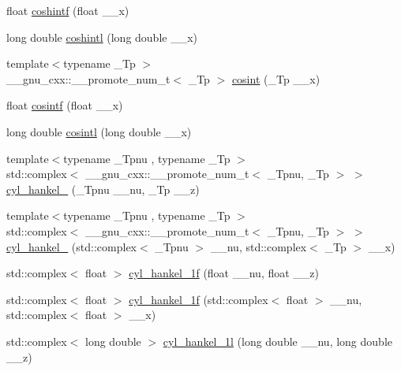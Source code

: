 \begin{DoxyCompactItemize}
\item 
float \hyperlink{namespace____gnu__cxx_a1af4d48209169967a836bd97e625a128}{coshintf} (float \+\_\+\+\_\+x)
\item 
long double \hyperlink{namespace____gnu__cxx_a6d24ab53fad13d421f07d9a9a509de14}{coshintl} (long double \+\_\+\+\_\+x)
\item 
{\footnotesize template$<$typename \+\_\+\+Tp $>$ }\\\+\_\+\+\_\+gnu\+\_\+cxx\+::\+\_\+\+\_\+promote\+\_\+num\+\_\+t$<$ \+\_\+\+Tp $>$ \hyperlink{namespace____gnu__cxx_afa310665ffc65012269f6f90cb573502}{cosint} (\+\_\+\+Tp \+\_\+\+\_\+x)
\item 
float \hyperlink{namespace____gnu__cxx_a87202351dc97d2c69e42bf58f911fb5a}{cosintf} (float \+\_\+\+\_\+x)
\item 
long double \hyperlink{namespace____gnu__cxx_a5f01f17ae8859129860118b09d51791c}{cosintl} (long double \+\_\+\+\_\+x)
\item 
{\footnotesize template$<$typename \+\_\+\+Tpnu , typename \+\_\+\+Tp $>$ }\\std\+::complex$<$ \+\_\+\+\_\+gnu\+\_\+cxx\+::\+\_\+\+\_\+promote\+\_\+num\+\_\+t$<$ \+\_\+\+Tpnu, \+\_\+\+Tp $>$ $>$ \hyperlink{namespace____gnu__cxx_a385def5d98679e243626fb78a841795b}{cyl\+\_\+hankel\+\_} (\+\_\+\+Tpnu \+\_\+\+\_\+nu, \+\_\+\+Tp \+\_\+\+\_\+z)
\item 
{\footnotesize template$<$typename \+\_\+\+Tpnu , typename \+\_\+\+Tp $>$ }\\std\+::complex$<$ \+\_\+\+\_\+gnu\+\_\+cxx\+::\+\_\+\+\_\+promote\+\_\+num\+\_\+t$<$ \+\_\+\+Tpnu, \+\_\+\+Tp $>$ $>$ \hyperlink{namespace____gnu__cxx_a41f7964d4177b4299caf3769271814d2}{cyl\+\_\+hankel\+\_} (std\+::complex$<$ \+\_\+\+Tpnu $>$ \+\_\+\+\_\+nu, std\+::complex$<$ \+\_\+\+Tp $>$ \+\_\+\+\_\+x)
\item 
std\+::complex$<$ float $>$ \hyperlink{namespace____gnu__cxx_a89758ed03e56567baa62b90cc4784f71}{cyl\+\_\+hankel\+\_\+1f} (float \+\_\+\+\_\+nu, float \+\_\+\+\_\+z)
\item 
std\+::complex$<$ float $>$ \hyperlink{namespace____gnu__cxx_a810e021a3f11c1b2253c15c6f4d41143}{cyl\+\_\+hankel\+\_\+1f} (std\+::complex$<$ float $>$ \+\_\+\+\_\+nu, std\+::complex$<$ float $>$ \+\_\+\+\_\+x)
\item 
std\+::complex$<$ long double $>$ \hyperlink{namespace____gnu__cxx_acb49c66b4267fbc56906db02f14365f2}{cyl\+\_\+hankel\+\_\+1l} (long double \+\_\+\+\_\+nu, long double \+\_\+\+\_\+z)
\item 

\end{DoxyCompactItemize}
